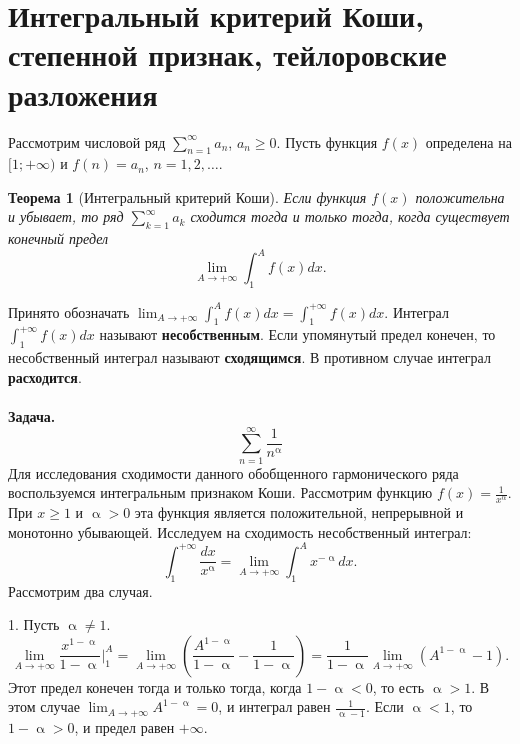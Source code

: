 \documentclass[a4paper, 12pt]{report}
\numberwithin{equation}{section}
\renewcommand{\geq}{\geqslant}
\renewcommand{\alpha}{\upalpha}
\newcommand{\sumn}{\sum\limits_{n=1}^\infty}
\newtheorem*{theorem}{Теорема}
\begin{document}
	\section{Интегральный критерий Коши, степенной признак, тейлоровские разложения}
	Рассмотрим числовой ряд $\sumn a_n$, $a_n \geq 0$.
	Пусть функция $f(x)$ определена на $[1;+\infty)$ и $f(n) = a_n$, $n=1,2,\ldots$.
	\begin{theorem}
		[Интегральный критерий Коши]
		Если функция $f(x)$ положительна и убывает, то ряд $\sum_{k=1}^{\infty} a_k$ сходится тогда и только тогда, когда существует конечный предел
		\begin{equation}
			\lim_{A \to +\infty} \int_{1}^{A} f(x)dx.
		\end{equation}
	\end{theorem}
	\noindent
	Принято обозначать $\lim_{A \to +\infty} \int_{1}^{A} f(x)dx = \int_{1}^{+\infty} f(x)dx$. Интеграл $\int_{1}^{+\infty} f(x)dx$ называют \textbf{несобственным}. Если упомянутый предел конечен, то несобственный интеграл называют \textbf{сходящимся}. В противном случае интеграл \textbf{расходится}.
	\\\\
	\textbf{Задача.}
	$$\sum_{n=1}^{\infty} \frac{1}{n^\alpha}$$
	Для исследования сходимости данного обобщенного гармонического ряда воспользуемся интегральным признаком Коши.
	Рассмотрим функцию $f(x) = \frac{1}{x^\alpha}$. При $x \ge 1$ и $\alpha > 0$ эта функция является положительной, непрерывной и монотонно убывающей.
	Исследуем на сходимость несобственный интеграл:
	$$ \int_{1}^{+\infty} \frac{dx}{x^\alpha} = \lim_{A \to +\infty} \int_{1}^{A} x^{-\alpha} dx. $$
	Рассмотрим два случая.
	
	1. Пусть $\alpha \neq 1$.
	$$ \lim_{A \to +\infty} \frac{x^{1-\alpha}}{1-\alpha} \Big|_{1}^{A} = \lim_{A \to +\infty} \left( \frac{A^{1-\alpha}}{1-\alpha} - \frac{1}{1-\alpha} \right) = \frac{1}{1-\alpha} \lim_{A \to +\infty} (A^{1-\alpha} - 1). $$
	Этот предел конечен тогда и только тогда, когда $1-\alpha < 0$, то есть $\alpha > 1$. В этом случае $\lim_{A \to +\infty} A^{1-\alpha} = 0$, и интеграл равен $\frac{1}{\alpha-1}$.
	Если $\alpha < 1$, то $1-\alpha > 0$, и предел равен $+\infty$.
	
\end{document}
